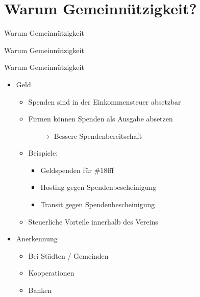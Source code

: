 \section*{Warum Gemeinnützigkeit?}
\begin{frame}{Warum Gemeinnützigkeit}
    \begin{center}
        Warum Gemeinnützigkeit
    \end{center}
\end{frame}

\begin{frame}{Warum Gemeinnützigkeit}
    \begin{itemize}
        \item Geld
        \begin{itemize}
            \item Spenden sind in der Einkommensteuer absetzbar
            \item Firmen können Spenden als Ausgabe absetzen
            \begin{itemize}
                \item[$\rightarrow$] Bessere Spendenbereitschaft
            \end{itemize}
            \item Beispiele:
            \begin{itemize}
                \item Geldspenden für \#18fff
                \item Hosting gegen Spendenbescheinigung
                \item Transit gegen Spendenbescheinigung
            \end{itemize}
            \item Steuerliche Vorteile innerhalb des Vereins
        \end{itemize}
        \item Anerkennung
        \begin{itemize}
            \item Bei Städten / Gemeinden
            \item Kooperationen
            \item Banken
        \end{itemize}
    \end{itemize}
\end{frame}

